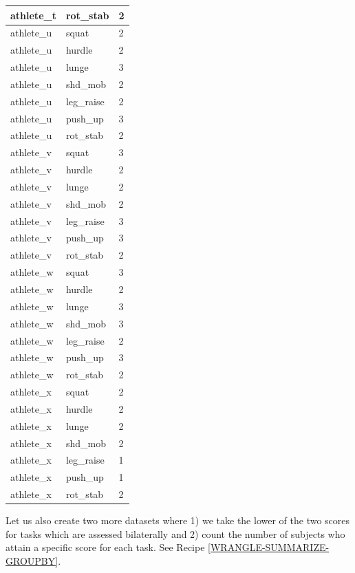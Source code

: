 \documentclass[
]{book}
\begin{document}
\begin{tabular}{l|l|l}
\hline
athlete\_t & rot\_stab & 2\\
\hline
athlete\_u & squat & 2\\
\hline
athlete\_u & hurdle & 2\\
\hline
athlete\_u & lunge & 3\\
\hline
athlete\_u & shd\_mob & 2\\
\hline
athlete\_u & leg\_raise & 2\\
\hline
athlete\_u & push\_up & 3\\
\hline
athlete\_u & rot\_stab & 2\\
\hline
athlete\_v & squat & 3\\
\hline
athlete\_v & hurdle & 2\\
\hline
athlete\_v & lunge & 2\\
\hline
athlete\_v & shd\_mob & 2\\
\hline
athlete\_v & leg\_raise & 3\\
\hline
athlete\_v & push\_up & 3\\
\hline
athlete\_v & rot\_stab & 2\\
\hline
athlete\_w & squat & 3\\
\hline
athlete\_w & hurdle & 2\\
\hline
athlete\_w & lunge & 3\\
\hline
athlete\_w & shd\_mob & 3\\
\hline
athlete\_w & leg\_raise & 2\\
\hline
athlete\_w & push\_up & 3\\
\hline
athlete\_w & rot\_stab & 2\\
\hline
athlete\_x & squat & 2\\
\hline
athlete\_x & hurdle & 2\\
\hline
athlete\_x & lunge & 2\\
\hline
athlete\_x & shd\_mob & 2\\
\hline
athlete\_x & leg\_raise & 1\\
\hline
athlete\_x & push\_up & 1\\
\hline
athlete\_x & rot\_stab & 2\\
\hline
\end{tabular}

Let us also create two more datasets where 1) we take the lower of the two scores for tasks which are assessed bilaterally and 2) count the number of subjects who attain a specific score for each task. See Recipe \ref{WRANGLE-SUMMARIZE-GROUPBY}.
\end{document}
